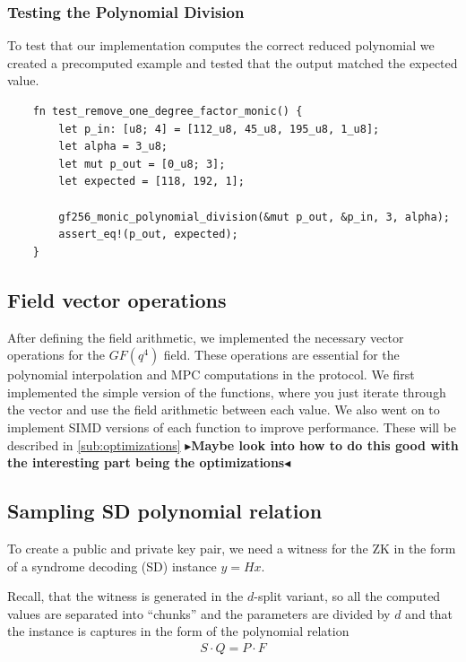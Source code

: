 \documentclass[11pt]{report}
\theoremstyle{definition}
\theoremstyle{plain}
\newcommand{\todo}[1]{{\color[rgb]{.5,0,0}\textbf{$\blacktriangleright$#1$\blacktriangleleft$}}}
\begin{document}
\subsubsection{Testing the Polynomial Division}
To test that our implementation computes the correct reduced polynomial we created a precomputed example and tested that the output matched the expected value.
\begin{verbatim}
    fn test_remove_one_degree_factor_monic() {
        let p_in: [u8; 4] = [112_u8, 45_u8, 195_u8, 1_u8];
        let alpha = 3_u8;
        let mut p_out = [0_u8; 3];
        let expected = [118, 192, 1];

        gf256_monic_polynomial_division(&mut p_out, &p_in, 3, alpha);
        assert_eq!(p_out, expected);
    }
\end{verbatim}

\subsection{Field vector operations}\label{sub:field_vector_operations} %
After defining the field arithmetic, we implemented the necessary vector operations for the $GF(q^4)$ field. These operations are essential for the polynomial interpolation and MPC computations in the protocol.
We first implemented the simple version of the functions, where you just iterate through the vector and use the field arithmetic between each value. We also went on to implement SIMD versions of each function to improve performance. These will be described in \autoref{sub:optimizations}
\todo{Maybe look into how to do this good with the interesting part being the optimizations}

\subsection{Sampling SD polynomial relation}\label{sub:witness_generation}

To create a public and private key pair, we need a witness for the ZK in the form of a syndrome decoding (SD) instance $y = Hx$.

Recall, that the witness is generated in the $d$-split variant, so all the computed values are separated into ``chunks'' and the parameters are divided by $d$ and that the instance is captures in the form of the polynomial relation
\begin{align*}
  S\cdot Q = P\cdot F
\end{align*}
\end{document}

